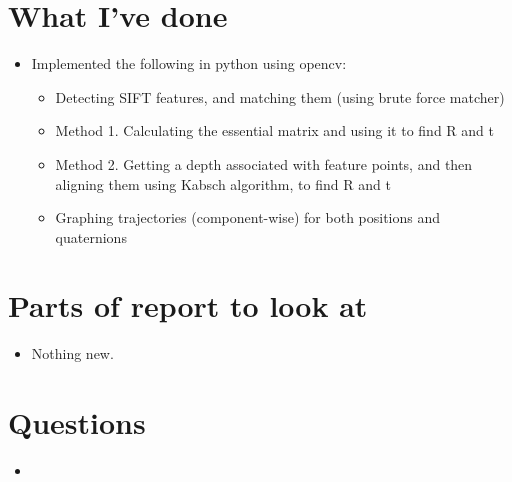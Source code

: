 \documentclass[12pt,a4paper]{article}
\begin{document}
\author{Katrina Ashton}


\pagestyle{fancy}
\fancyhf{}
\rhead{\thepage}

\section{What I've done}
\begin{itemize}
\item{Implemented the following in python using opencv:}
\begin{itemize}
\item Detecting SIFT features, and matching them (using brute force matcher)
\item Method 1. Calculating the essential matrix and using it to find R and t
\item Method 2. Getting a depth associated with feature points, and then aligning them using Kabsch algorithm, to find R and t
\item Graphing trajectories (component-wise) for both positions and quaternions
\end{itemize}
\end{itemize}

\section{Parts of report to look at}
\begin{itemize}
\item{Nothing new.}
\end{itemize}

\section{Questions}
\begin{itemize}
\item
\end{itemize}
\end{document}
